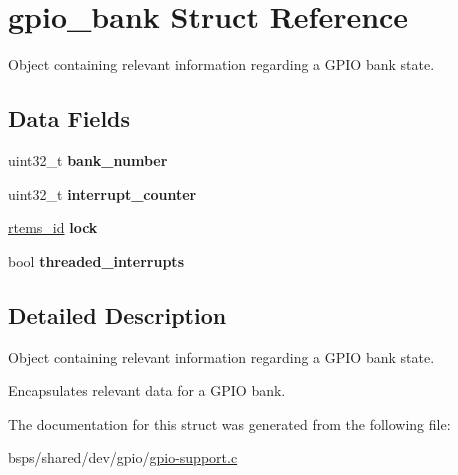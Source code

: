 \hypertarget{structgpio__bank}{}\section{gpio\+\_\+bank Struct Reference}
\label{structgpio__bank}


Object containing relevant information regarding a G\+P\+IO bank state.  


\subsection*{Data Fields}
\begin{DoxyCompactItemize}
\item 
\mbox{\label{structgpio__bank_a46b73dca15728782030959cc69713d93}} 
uint32\+\_\+t {\bfseries bank\+\_\+number}
\item 
\mbox{\label{structgpio__bank_a1c584334ff8ecd26385908858deaab55}} 
uint32\+\_\+t {\bfseries interrupt\+\_\+counter}
\item 
\mbox{\label{structgpio__bank_a1aa5794d483a78db8e6b00f208fd4e90}} 
\mbox{\hyperlink{group__ClassicTasks_gab20892b814dced7dd4e5b9bf42becd57}{rtems\+\_\+id}} {\bfseries lock}
\item 
\mbox{\label{structgpio__bank_a4ac6b61a8295ec83c8b523439b98b4ef}} 
bool {\bfseries threaded\+\_\+interrupts}
\end{DoxyCompactItemize}


\subsection{Detailed Description}
Object containing relevant information regarding a G\+P\+IO bank state. 

Encapsulates relevant data for a G\+P\+IO bank. 

The documentation for this struct was generated from the following file\+:\begin{DoxyCompactItemize}
\item 
bsps/shared/dev/gpio/\mbox{\hyperlink{gpio-support_8c}{gpio-\/support.\+c}}\end{DoxyCompactItemize}
